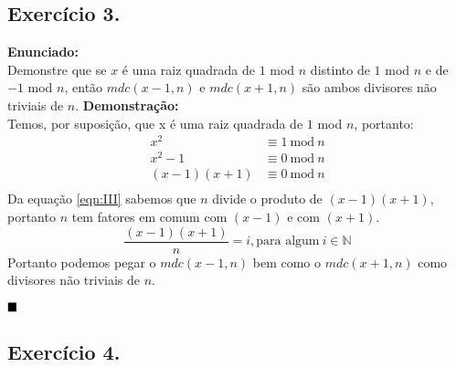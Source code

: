\documentclass[12pt]{article}
\newcommand{\bb}[1]{\mathbb{#1}}
\newcommand{\N}{\bb{N}}
\begin{document}
\subsection*{Exercício 3.}
	\textbf{Enunciado:}\\
	Demonstre que se $x$ é uma raiz quadrada de $1$ mod $n$ distinto de
	$1$ mod $n$ e de $-1$ mod $n$, então $mdc(x-1, n)$ e $mdc(x+1, n)$
	são ambos divisores não triviais de $n$.
	\newline
	\newline
	\textbf{Demonstração:}\\
	Temos, por suposição, que x é uma raiz quadrada de $1$ mod $n$, portanto:
	\begin{align*}
			x^2 &\equiv 1 \ \mathrm{mod} \ n\\
			x^2 - 1 &\equiv 0 \ \mathrm{mod} \ n\\
			\label{eqn:III}\tag{I}
				(x - 1)(x + 1) &\equiv 0 \ \mathrm{mod} \ n\\
	\end{align*}
	Da equação \eqref{eqn:III} sabemos que $n$ divide o produto de $(x-1)(x+1)$,
	portanto $n$ tem fatores em comum com $(x-1)$ e com $(x+1)$.\\
	$$\frac{(x-1)(x+1)}{n} = i,   \text{para algum} \  i \in \N$$
	Portanto podemos pegar o $mdc(x-1, n)$ bem como o $mdc(x+1, n)$ como 
	divisores  não triviais de $n$.
	
	$\hfill\blacksquare$
	
\subsection*{Exercício 4.}
\end{document}
